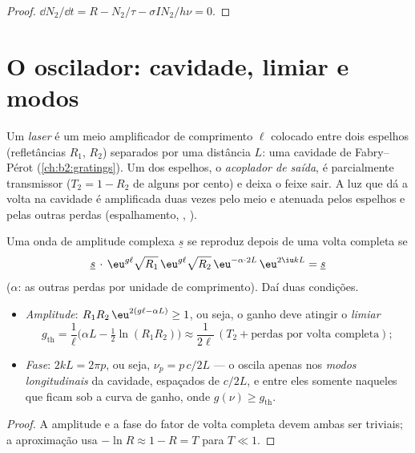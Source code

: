 \begin{proof}
$\dd N_2/\dd t = R - N_2/\tau - \sigma I N_2/h\nu = 0$.
\end{proof}

\section{O oscilador: cavidade, limiar e modos}

\begin{definition}\label{def:b2:laser:cavity}
Um \emph{laser} é um meio amplificador de comprimento $\ell$
colocado entre dois espelhos (refletâncias $R_1$, $R_2$) separados por uma distância $L$:
uma cavidade de Fabry--Pérot (\cref{ch:b2:gratings}). Um dos espelhos, o
\emph{acoplador de saída}, é parcialmente transmissor ($T_2 = 1 - R_2$ de alguns
por cento) e deixa o feixe sair. A luz que dá a volta na cavidade é
amplificada duas vezes pelo meio e atenuada pelos espelhos e pelas
outras perdas (espalhamento, , ).
\end{definition}

\begin{theorem}\label{thm:b2:laser:threshold}
Uma onda de amplitude complexa $\underline s$ se reproduz depois de uma
volta completa se
\[
\underline s\,\cdot\, \eu^{g\ell}\sqrt{R_1}\,\eu^{g\ell}\sqrt{R_2}\,
\eu^{-\alpha\cdot 2L}\,\eu^{2\iu kL} = \underline s
\]
($\alpha$: as outras perdas por unidade de comprimento). Daí duas condições.
\begin{itemize}
\item \emph{Amplitude}: $R_1R_2\,\eu^{2(g\ell - \alpha L)} \ge 1$, ou seja, o
      ganho deve atingir o \emph{limiar}
      \[
      g_{\text{th}} = \frac{1}{\ell}\Big(\alpha L - \tfrac12\ln(R_1R_2)\Big)
      \approx \frac{1}{2\ell}\,(T_2 + \text{perdas por volta completa}) ;
      \]
\item \emph{Fase}: $2kL = 2\pi p$, ou seja, $\nu_p = p\,c/2L$ --- o 
      oscila apenas nos \emph{modos longitudinais} da cavidade, espaçados de $c/2L$, e entre eles somente
      naqueles que ficam sob a curva de ganho, onde $g(\nu) \ge g_{\text{th}}$.
\end{itemize}
\end{theorem}

\begin{proof}
A amplitude e a fase do fator de volta completa devem ambas ser triviais; a
aproximação usa $-\ln R \approx 1 - R = T$ para $T \ll 1$.
\end{proof}

